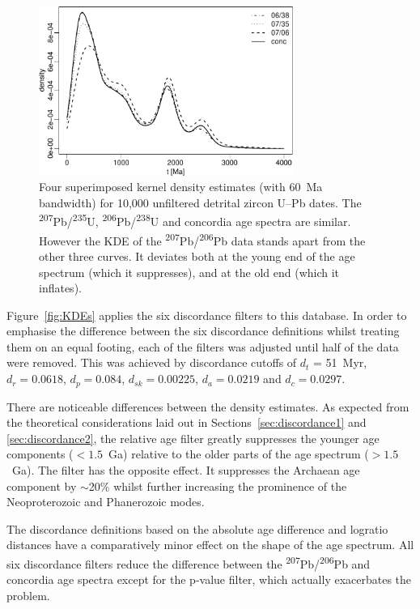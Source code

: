 \documentclass[gchron, manuscript]{copernicus}
\begin{document}
\begin{figure}[t]
  \includegraphics[width=8.3cm]{KDE.pdf}
  \caption{Four superimposed kernel density estimates (with 60~Ma
    bandwidth) for 10,000 unfiltered detrital zircon U--Pb
    dates. The \textsuperscript{207}Pb/\textsuperscript{235}U,
    \textsuperscript{206}Pb/\textsuperscript{238}U and concordia age
    spectra are similar.  However the KDE of the
    \textsuperscript{207}Pb/\textsuperscript{206}Pb data stands
    apart from the other three curves. It deviates both at the young
    end of the age spectrum (which it suppresses), and at the old
    end (which it inflates).
  }
  \label{fig:KDE}
\end{figure}

Figure~\ref{fig:KDEs} applies the six discordance filters to this
database. In order to emphasise the difference between the six
discordance definitions whilst treating them on an equal footing, each
of the filters was adjusted until half of the data were removed. This
was achieved by discordance cutoffs of $d_t$ = 51~Myr, $d_r = 0.0618$,
$d_{p} = 0.084$, $d_{sk} = 0.00225$, $d_a = 0.0219$ and $d_c =
0.0297$.

There are noticeable differences between the density estimates.  As
expected from the theoretical considerations laid out in
Sections~\ref{sec:discordance1} and \ref{sec:discordance2}, the
relative age filter greatly suppresses the younger age components
($<1.5$~Ga) relative to the older parts of the age spectrum
($>1.5$~Ga). The \citet{stacey1975} filter has the opposite effect.
It suppresses the Archaean age component by $\sim$20\% whilst further
increasing the prominence of the Neoproterozoic and Phanerozoic modes.

The discordance definitions based on the absolute age difference and
logratio distances have a comparatively minor effect on the shape of
the age spectrum. All six discordance filters reduce the difference
between the \textsuperscript{207}Pb/\textsuperscript{206}Pb and
concordia age spectra except for the p-value filter, which actually
exacerbates the problem.
\end{document}
